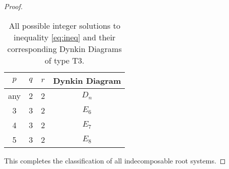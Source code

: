 \begin{proof}
\begin{enumerate}
        \begin{table}
        \begin{center}
        \begin{tabular}{|| c | c | c | c ||}
            \hline $p$ & $q$ & $r$ & Dynkin Diagram\\ \hline \hline
            any & 2 & 2 & $D_n$ \\ \hline
            3 & 3 & 2 & $E_6$ \\ \hline
            4 & 3 & 2 & $E_7$ \\ \hline
            5 & 3 & 2 & $E_8$ \\ \hline
        \end{tabular}
        \end{center}
        \caption{All possible integer solutions to inequality \ref{eq:ineq} and their corresponding Dynkin Diagrams of type T3.}
        \end{table}
    \end{enumerate}
    
    This completes the classification of all indecomposable root systems.

\end{proof}